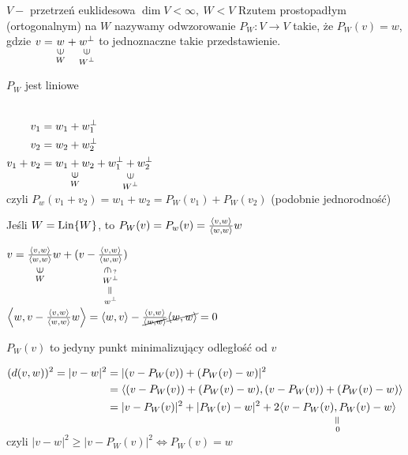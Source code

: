 \begin{df} 
    $V - $ przetrzeń euklidesowa $\dim V < \infty,\ W < V$ 
    Rzutem prostopadłym (ortogonalnym) na $W$ nazywamy odwzorowanie $P_W: V \to V$ 
    takie, że $P_W (v) = w$, gdzie $v = \underscript{w}{\vertni}{W} +
    \underscript{w^\bot}{\vertni}{W^\bot}$ to jednoznaczne takie przedstawienie. 
\end{df} 
\begin{ft} 
    $P_W$ jest liniowe
\end{ft} 
\begin{dd} ~\\ 
    $\begin{aligned}[t] 
        v_1 &= w_1 + w_1^\bot \\ 
        v_2 &= w_2 + w_2^\bot \\ 
        v_1 + v_2 &= \underscript{w_1+w_2}{\vertni}{W}+
        \underscript{w_1^\bot+w_2^\bot}{\vertni}{W^\bot}
    \end{aligned}$ \\czyli $P_w(v_1 + v_2) = w_1 + w_2= P_W (v_1) + P_W (v_2)$ (podobnie
    jednorodność)
\end{dd} 
\begin{ft} 
    Jeśli $W = \operatorname{Lin}\{W\}$, to $P_W(v) = P_w(v) = \frac{\left\langle v, w \right\rangle}{\left\langle w, w \right\rangle} w$
\end{ft} 
\begin{dd} 
    $v = \underscript{\frac{\scp vw}{\scp ww}}{\vertni}{W} w
    + (v- \underscript{\frac{\scp vw}{\scp ww}}{\vertin\; ?}{\underscript{W^\bot}{\verteq}
    {w^\bot}})$ \\ 
    $\left\langle w, v - \frac{\left\langle v, w \right\rangle}{\left\langle w, w \right\rangle}w \right\rangle = \left\langle w, v \right\rangle - \frac{\left\langle v, w \right\rangle}{\cancel{\left\langle w, w \right\rangle}}
    \cancel{\left\langle w, w \right\rangle} = 0$
\end{dd} 
\begin{ft} 
    $P_W(v)$ to jedyny punkt minimalizujący odległość od $v$
\end{ft} 
\begin{dd} 
    $\begin{aligned}[t]
        (d(v,w))^2 = |v-w|^2 &= |(v - P_W(v)) + (P_W(v)-w)|^2 \\ 
                             &= \scp{(v-P_W(v))+(P_W(v)-w)}{(v-P_W(v))+(P_W(v)-w)} \\
                             &= |v - P_W(v)|^2 + |P_W(v)-w|^2 + 2\underscript
                             {\scp{v-P_W(v)}{P_W(v)-w}}{\verteq}{0}
    \end{aligned}$ \\
    czyli $|v-w|^2 \ge |v - P_W(v)|^2 \Leftrightarrow P_W(v) = w$
\end{dd} 
